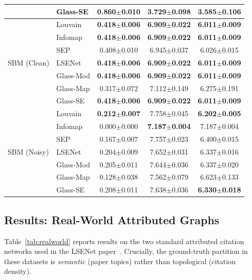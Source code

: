 \begin{table}[ht]
{\begin{tabular}{llccc}
  & Glass-SE  & 0.860$\pm$0.010 & 3.729$\pm$0.098 & 3.585$\pm$0.106 \\
\midrule
\multirow{7}{*}{SBM (Clean)}
  & Louvain   & \textbf{0.418$\pm$0.006} & \textbf{6.909$\pm$0.022} & \textbf{6.011$\pm$0.009} \\
  & Infomap   & \textbf{0.418$\pm$0.006} & \textbf{6.909$\pm$0.022} & \textbf{6.011$\pm$0.009} \\
  & SEP       & 0.408$\pm$0.010 & 6.945$\pm$0.037 & 6.026$\pm$0.015 \\
  & LSENet    & \textbf{0.418$\pm$0.006} & \textbf{6.909$\pm$0.022} & \textbf{6.011$\pm$0.009} \\
  & Glass-Mod & \textbf{0.418$\pm$0.006} & \textbf{6.909$\pm$0.022} & \textbf{6.011$\pm$0.009} \\
  & Glass-Map & 0.317$\pm$0.072 & 7.112$\pm$0.149 & 6.275$\pm$0.191 \\
  & Glass-SE  & \textbf{0.418$\pm$0.006} & \textbf{6.909$\pm$0.022} & \textbf{6.011$\pm$0.009} \\
\midrule
\multirow{7}{*}{SBM (Noisy)}
  & Louvain   & \textbf{0.212$\pm$0.007} & 7.758$\pm$0.045 & \textbf{6.202$\pm$0.005} \\
  & Infomap   & 0.000$\pm$0.000 & \textbf{7.187$\pm$0.004} & 7.187$\pm$0.004 \\
  & SEP       & 0.167$\pm$0.007 & 7.757$\pm$0.023 & 6.400$\pm$0.015 \\
  & LSENet    & 0.204$\pm$0.009 & 7.652$\pm$0.031 & 6.337$\pm$0.016 \\
  & Glass-Mod & 0.205$\pm$0.011 & 7.644$\pm$0.036 & 6.337$\pm$0.020 \\
  & Glass-Map & 0.128$\pm$0.038 & 7.562$\pm$0.079 & 6.623$\pm$0.133 \\
  & Glass-SE  & 0.208$\pm$0.011 & 7.638$\pm$0.036 & \textbf{6.330$\pm$0.018} \\
\bottomrule
\end{tabular}%
}
\end{table}

\subsection{Results: Real-World Attributed Graphs}
\label{subsec:benchmark-realworld}

Table~\ref{tab:realworld} reports results on the two standard attributed citation
networks used in the LSENet paper~\cite{sun2024lsenet}.
Crucially, the ground-truth partition in these datasets is \emph{semantic}
(paper topics) rather than topological (citation density).

